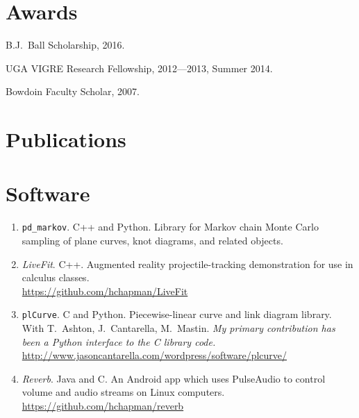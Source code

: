 \documentclass[letterpaper]{article}
\renewenvironment{itemize}{
  \begin{list}{}{
    \setlength{\leftmargin}{1.5em}
  }
}{
  \end{list}
}
\begin{document}
 \section*{Awards}

 \begin{itemize}
 \item B.J.\ Ball Scholarship, 2016.
 \item UGA VIGRE Research Fellowship, 2012---2013, Summer 2014.
 \item Bowdoin Faculty Scholar, 2007.
 \end{itemize}

\section*{Publications}

\nocite{*}
\printbibliography[heading=none]

\section*{Software}

\begin{enumerate}
\item \texttt{pd\_markov}. C++ and Python. Library for Markov chain Monte Carlo sampling of plane curves, knot diagrams, and related objects.
\item \emph{LiveFit}. C++. Augmented reality projectile-tracking demonstration
  for use in calculus classes. \\
  \url{https://github.com/hchapman/LiveFit}
\item \texttt{plCurve}. C and Python. Piecewise-linear curve and link diagram library.\\
  With T.\ Ashton, J.\ Cantarella, M.\ Mastin.
  \textit{My primary contribution has been a Python interface to the C
    library code.} \\
  \url{http://www.jasoncantarella.com/wordpress/software/plcurve/}
\item \emph{Reverb}. Java and C. An Android app which uses PulseAudio to
  control volume and audio streams on Linux computers. \\
  \url{https://github.com/hchapman/reverb}
\end{enumerate}

\end{document}
